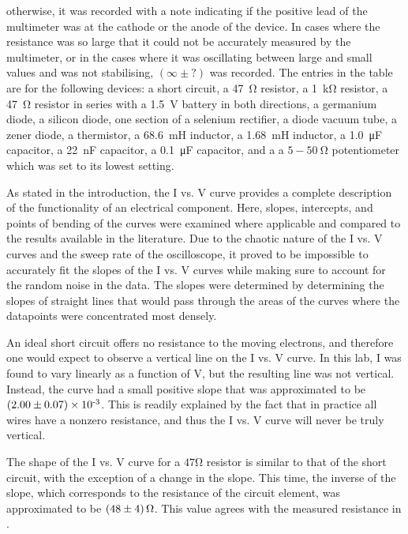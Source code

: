 \begin{paper}
{otherwise, it was recorded with a note indicating if the positive lead of the multimeter was at the cathode or the anode of the device.
In cases where the resistance was so large that it could not be accurately measured by the multimeter, or in the cases where it was oscillating between large and small values and was not stabilising, $(\infty\pm?)$ was recorded.
The entries in the table are for the following devices: a short circuit, a \SI{47}{\ohm} resistor, a \SI{1}{\kilo\ohm} resistor, a \SI{47}{\ohm} resistor in series with a \SI{1.5}{\volt} battery in both directions, a germanium diode, a silicon diode, one section of a selenium rectifier, a diode vacuum tube, a zener diode, a thermistor, a \SI{68.6}{\milli\henry} inductor, a \SI{1.68}{\milli\henry} inductor, a \SI{1.0}{\micro\farad} capacitor, a \SI{22}{\nano\farad} capacitor, a \SI{0.1}{\micro\farad} capacitor, and a a $5-\SI{50}{\ohm}$ potentiometer which was set to its lowest setting.}
	
	
	As stated in the introduction, the I vs. V curve provides a complete description of the functionality of an electrical component. Here, slopes, intercepts, and points of bending of the curves were examined where applicable and compared to the results available in the literature. Due to the chaotic nature of the I vs. V curves and the sweep rate of the oscilloscope, it proved to be impossible to accurately fit the slopes of the I vs. V curves while making sure to account for the random noise in the data.
The slopes were determined by determining the slopes of straight lines that would pass through the areas of the curves where the datapoints were concentrated most densely.
	
	An ideal short circuit offers no resistance to the moving electrons, and therefore one would expect to observe a vertical line on the I vs. V curve. In this lab, I was found to vary linearly as a function of V, but the resulting line was not vertical. Instead, the curve had a small positive slope that was approximated to be \( \left(2.00 \pm 0.07\right) \times 10^\text{-3} \). This is readily explained by the fact that in practice all wires have a nonzero resistance, and thus the I vs. V curve will never be truly vertical.
	
	The shape of the I vs. V curve for a \( 47 \si{\ohm} \)  resistor is similar to that of the short circuit, with the exception of a change in the slope. This time, the inverse of the slope, which corresponds to the resistance of the circuit element, was approximated to be \( \left(48 \pm 4\right) \si{\ohm} \). This value agrees with the measured resistance in \figResistances.
	

\end{paper}
